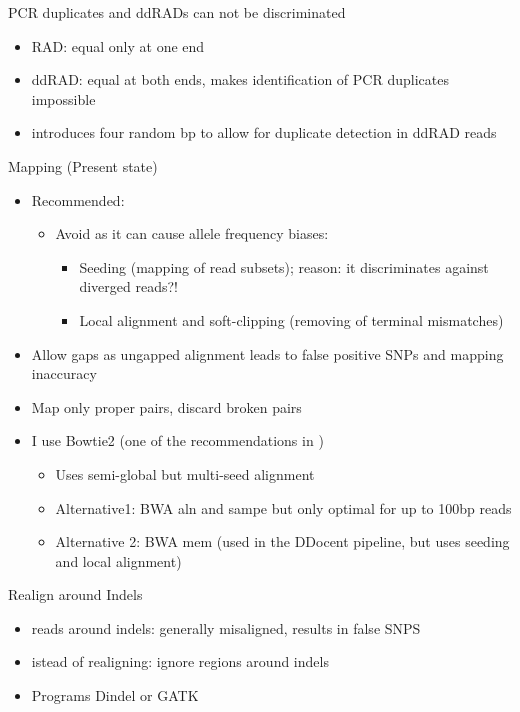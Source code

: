 \documentclass[presentation]{beamer}
\begin{document}
\begin{frame}[label=sec-19]{PCR duplicates and ddRADs can not be discriminated}
\begin{itemize}
\item RAD: equal only at one end
\item ddRAD: equal at both ends, makes identification of PCR duplicates
impossible
\item \citep{Tin2014} introduces four random bp to allow for duplicate
detection in ddRAD reads
\end{itemize}
\end{frame}

\begin{frame}[label=sec-20]{Mapping (Present state)}
\begin{itemize}
\item Recommended: 
\begin{itemize}
\item Avoid as it can cause allele frequency biases:
\begin{itemize}
\item Seeding (mapping of read subsets); reason: it discriminates
against diverged reads?!
\item Local alignment and soft-clipping (removing of terminal
mismatches)
\end{itemize}
\end{itemize}
\item Allow gaps as ungapped alignment leads to false positive SNPs and mapping inaccuracy
\item Map only proper pairs, discard broken pairs
\item I use Bowtie2 (one of the recommendations in \citep{Schlotterer2014})
\begin{itemize}
\item Uses semi-global but multi-seed alignment
\item Alternative1: BWA aln and sampe but only optimal for up to 100bp
reads
\item Alternative 2: BWA mem (used in the DDocent pipeline, but uses
seeding and local alignment)
\end{itemize}
\end{itemize}
\end{frame}

\begin{frame}[label=sec-21]{Realign around Indels}
\begin{itemize}
\item reads around indels: generally misaligned, results in false SNPS
\item istead of realigning: ignore regions around indels
\item Programs Dindel or GATK
\end{itemize}
\end{frame}
\end{document}

